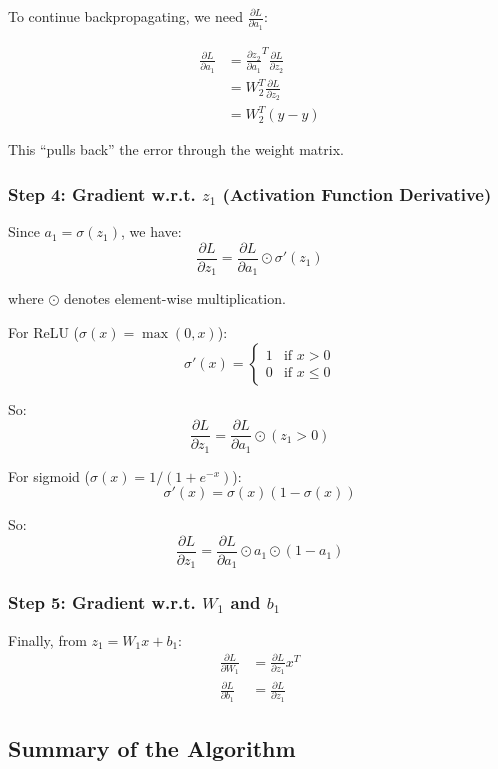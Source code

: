 To continue backpropagating, we need $\frac{\partial L}{\partial a_1}$:

\begin{align*}
\frac{\partial L}{\partial a_1} &= \frac{\partial z_2}{\partial a_1}^T \frac{\partial L}{\partial z_2} \\
&= W_2^T \frac{\partial L}{\partial z_2} \\
&= W_2^T (\hat{y} - y)
\end{align*}

This ``pulls back'' the error through the weight matrix.

\subsubsection{Step 4: Gradient w.r.t. $z_1$ (Activation Function Derivative)}

Since $a_1 = \sigma(z_1)$, we have:
\[
\frac{\partial L}{\partial z_1} = \frac{\partial L}{\partial a_1} \odot \sigma'(z_1)
\]

where $\odot$ denotes element-wise multiplication.

For ReLU ($\sigma(x) = \max(0, x)$):
\[
\sigma'(x) = \begin{cases}
1 & \text{if } x > 0 \\
0 & \text{if } x \leq 0
\end{cases}
\]

So:
\[
\frac{\partial L}{\partial z_1} = \frac{\partial L}{\partial a_1} \odot (z_1 > 0)
\]

For sigmoid ($\sigma(x) = 1/(1 + e^{-x})$):
\[
\sigma'(x) = \sigma(x)(1 - \sigma(x))
\]

So:
\[
\frac{\partial L}{\partial z_1} = \frac{\partial L}{\partial a_1} \odot a_1 \odot (1 - a_1)
\]

\subsubsection{Step 5: Gradient w.r.t. $W_1$ and $b_1$}

Finally, from $z_1 = W_1 x + b_1$:
\begin{align*}
\frac{\partial L}{\partial W_1} &= \frac{\partial L}{\partial z_1} x^T \\
\frac{\partial L}{\partial b_1} &= \frac{\partial L}{\partial z_1}
\end{align*}

\subsection{Summary of the Algorithm}

